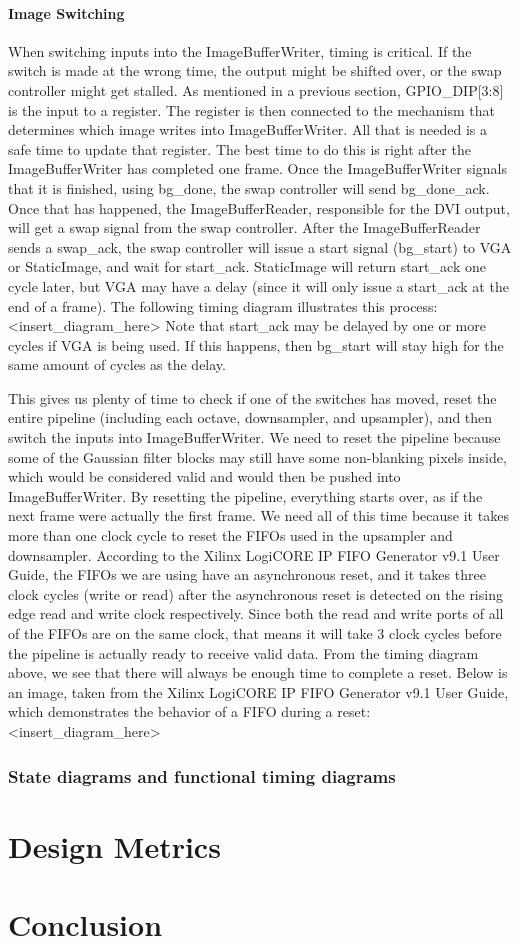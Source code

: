 \documentclass[12pt]{article}
\begin{document}
\paragraph{Image Switching}
When switching inputs into the ImageBufferWriter, timing is critical. If the switch is made at the wrong time, the output might be shifted over, or the swap controller might get stalled. As mentioned in a previous section, GPIO\_DIP[3:8] is the input to a register. The register is then connected to the mechanism that determines which image writes into ImageBufferWriter. All that is needed is a safe time to update that register. The best time to do this is right after the ImageBufferWriter has completed one frame. Once the ImageBufferWriter signals that it is finished, using bg\_done, the swap controller will send bg\_done\_ack. Once that has happened, the ImageBufferReader, responsible for the DVI output, will get a swap signal from the swap controller. After the ImageBufferReader sends a swap\_ack, the swap controller will issue a start signal (bg\_start) to VGA or StaticImage, and wait for start\_ack. StaticImage will return start\_ack one cycle later, but VGA may have a delay (since it will only issue a start\_ack at the end of a frame). The following timing diagram illustrates this process: <insert\_diagram\_here> Note that start\_ack may be delayed by one or more cycles if VGA is being used. If this happens, then bg\_start will stay high for the same amount of cycles as the delay.

This gives us plenty of time to check if one of the switches has moved, reset 
the entire pipeline (including each octave, downsampler, and upsampler), and 
then switch the inputs into ImageBufferWriter. We need to reset the pipeline 
because some of the Gaussian filter blocks may still have some non-blanking 
pixels inside, which would be considered valid and would then be pushed into 
ImageBufferWriter. By resetting the pipeline, everything starts over, as if the 
next frame were actually the first frame. We need all of this time because it 
takes more than one clock cycle to reset the FIFOs used in the upsampler and 
downsampler. According to the Xilinx LogiCORE IP FIFO Generator v9.1 User Guide, 
the FIFOs we are using have an asynchronous reset, and it takes three clock 
cycles (write or read) after the asynchronous reset is detected on the rising 
edge read and write clock respectively. Since both the read and write ports 
of all of the FIFOs are on the same clock, that means it will take 3 clock 
cycles before the pipeline is actually ready to receive valid data. From the 
timing diagram above, we see that there will always be enough time to complete 
a reset. Below is an image, taken from the Xilinx LogiCORE IP FIFO Generator 
v9.1 User Guide, which demonstrates the behavior of a FIFO during a reset: 
<insert\_diagram\_here>

\subsubsection{State diagrams and functional timing diagrams}

\section{Design Metrics}

\section{Conclusion}
\end{document}
